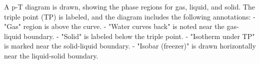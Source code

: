 A p-T diagram is drawn, showing the phase regions for gas, liquid, and solid. The triple point (TP) is labeled, and the diagram includes the following annotations:  
- "Gas" region is above the curve.  
- "Water curves back" is noted near the gas-liquid boundary.  
- "Solid" is labeled below the triple point.  
- "Isotherm under TP" is marked near the solid-liquid boundary.  
- "Isobar (freezer)" is drawn horizontally near the liquid-solid boundary.